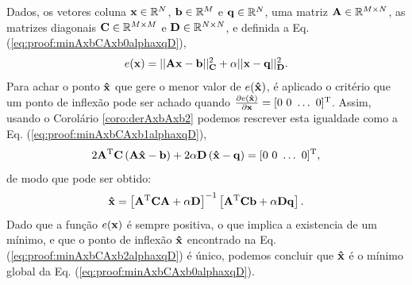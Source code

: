 \begin{myproofT}
\label{proof:theo:minAxbCAxbalphaxqD}
Dados,
os vetores coluna $\VECTOR{x}\in \mathbb{R}^N$, $\VECTOR{b}\in \mathbb{R}^M$ e $\VECTOR{q}\in \mathbb{R}^N$,  
uma matriz $\MATRIX{A} \in \mathbb{R}^{M\times N}$, 
as matrizes diagonais $\MATRIX{C} \in \mathbb{R}^{M\times M}$ e $\MATRIX{D} \in \mathbb{R}^{N\times N}$, e 
definida a Eq. (\ref{eq:proof:minAxbCAxb0alphaxqD}),
\begin{equation}\label{eq:proof:minAxbCAxb0alphaxqD}
e(\VECTOR{x})=||\MATRIX{A}\VECTOR{x}-\VECTOR{b}||_{\MATRIX{C}}^2+\alpha||\VECTOR{x}-\VECTOR{q}||_{\MATRIX{D}}^2.
\end{equation}
Para achar o ponto $\VECTOR{\hat{x}}$ que gere o menor valor de $e(\VECTOR{\hat{x}})$, é aplicado
o critério que um ponto de inflexão pode ser achado quando 
$\frac{\partial e(\VECTOR{\hat{x}})}{\partial \VECTOR{x} }=[0~ 0~ \hdots~ 0 ]^{\transpose}$.
Assim, usando o Corolário \ref{coro:derAxbAxb2} podemos 
rescrever esta igualdade como a Eq. (\ref{eq:proof:minAxbCAxb1alphaxqD}),
\begin{equation}\label{eq:proof:minAxbCAxb1alphaxqD}
2 \MATRIX{A}^{\transpose}\MATRIX{C}\left(\MATRIX{A}\VECTOR{\hat{x}}-\VECTOR{b}\right)
+2 \alpha\MATRIX{D}\left(\VECTOR{\hat{x}}-\VECTOR{q}\right)=[0~ 0~ \hdots~ 0 ]^{\transpose},
\end{equation}
de modo que pode ser obtido:
\begin{equation}\label{eq:proof:minAxbCAxb2alphaxqD}
\VECTOR{\hat{x}}=\left[ \MATRIX{A}^{\transpose}\MATRIX{C}\MATRIX{A} +\alpha\MATRIX{D}\right]^{-1} 
\left[ \MATRIX{A}^{\transpose}\MATRIX{C} \VECTOR{b}+\alpha\MATRIX{D}\VECTOR{q}\right].
\end{equation}
Dado que  a função $e(\VECTOR{x})$ é sempre positiva, o que implica a existencia de um mínimo,
e que o ponto de inflexão $\VECTOR{\hat{x}}$ encontrado na Eq. (\ref{eq:proof:minAxbCAxb2alphaxqD}) é único, 
podemos concluir que  $\VECTOR{\hat{x}}$ é o mínimo global da Eq. (\ref{eq:proof:minAxbCAxb0alphaxqD}).
\end{myproofT}

